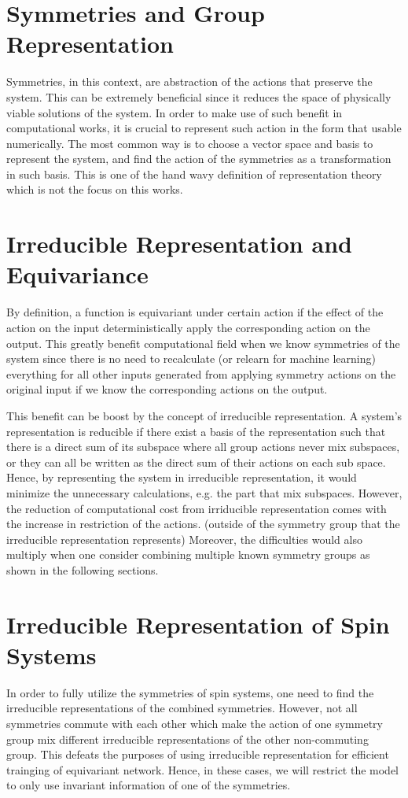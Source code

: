 \documentclass[reprint, 10pt]{revtex4-2}
\begin{document}
\section{Symmetries and Group Representation}
Symmetries, in this context, are abstraction of the actions that preserve the system. This can be extremely beneficial
since it reduces the space of physically viable solutions of the system. In order to make use of such benefit in computational
works, it is crucial to represent such action in the form that usable numerically. The most common way is to choose a 
vector space and basis to represent the system, and find the action of the symmetries as a transformation in such basis.
This is one of the hand wavy definition of representation theory which is not the focus on this works. 

\section{Irreducible Representation and Equivariance}
By definition, a function is equivariant under certain action if the effect of the action on the input deterministically
apply the corresponding action on the output. This greatly benefit computational field when we know symmetries of the 
system since there is no need to recalculate (or relearn for machine learning) everything for all other inputs generated
from applying symmetry actions on the original input if we know the corresponding actions on the output.

This benefit can be boost by the concept of irreducible representation. A system's representation is reducible if there exist
a basis of the representation such that there is a direct sum of its subspace where all group actions never mix subspaces, or
they can all be written as the direct sum of their actions on each sub space. Hence, by representing the system in irreducible
representation, it would minimize the unnecessary calculations, e.g. the part that mix subspaces. However, the reduction of
computational cost from irriducible representation comes with the increase in restriction of the actions. (outside of
the symmetry group that the irreducible representation represents) Moreover, the difficulties would also multiply when 
one consider combining multiple known symmetry groups as shown in the following sections.

\section{Irreducible Representation of Spin Systems}
In order to fully utilize the symmetries of spin systems, one need to find the irreducible representations of the combined
symmetries. However, not all symmetries commute with each other which make the action of one symmetry group mix different 
irreducible representations of the other non-commuting group. This defeats the purposes of using irreducible representation 
for efficient trainging of equivariant network. Hence, in these cases, we will restrict the model to only use invariant 
information of one of the symmetries.
\end{document}
